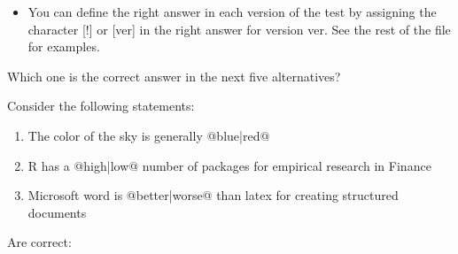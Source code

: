 \documentclass[10pt]{examdesign}
\begin{document}
\begin{examtop}
\begin{framed}
\begin{itemize}
            \item You can define the right answer in each version of the test by assigning the character [!] or [ver] in the right answer for version ver. See the rest of the file for examples.
    
    
        \end{itemize}
    
    \end{framed}
    
    \end{examtop}
    
    
    \vspace{1cm}
    
    \begin{multiplechoice}[resetcounter=no,  examcolumns=1]
    
    \begin{question}
    
        Which one is the correct answer in the next five alternatives?
    
    
    
    
    
    
    \end{question}
    
    \begin{question}
    
        Consider the following statements:
    
        \begin{enumerate}[I]
            \item The color of the sky is generally @{blue}|{red}@
    
            \item R has a @{high}|{low}@ number of packages for empirical research in Finance
    
            \item Microsoft word is @{better}|{worse}@ than latex for creating structured documents
        \end{enumerate}
    
        Are correct:
    
    
    
    

\end{question}
\end{multiplechoice}
\end{document}
